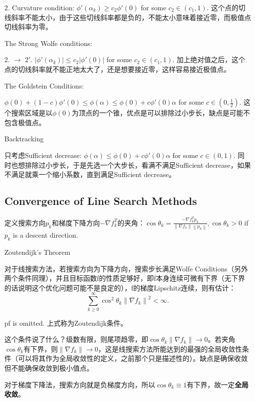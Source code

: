 2. Curvature condition: $\phi'(\alpha_k) \ge c_2 \phi'(0)$ for some $c_2 \in (c_1, 1)$. 这个点的切线斜率不能太小，由于这些切线斜率都是负的，不能太小意味着接近零，而极值点切线斜率为零。

The Strong Wolfe conditions:

2. $\to$ 2$'$. $|\phi'(\alpha_k)| \le c_2 |\phi'(0)|$ for some $c_2 \in (c_1, 1)$. 加上绝对值之后，这个点的切线斜率就不能正地太大了，还是想要接近零，这样容易接近极值点。

The Goldstein Conditions:

$\phi(0) + (1 - c) \phi'(0) \le \phi(\alpha) \le \phi(0) + c \phi'(0) \alpha$ for some $c \in (0, \frac{1}{2})$. 这个搜索区域是以$\phi(0)$为顶点的一个锥，优点是可以排除过小步长，缺点是可能不包含极值点。

Backtracking

只考虑Sufficient decrease: $\phi(\alpha) \le \phi(0) + c \phi'(0) \alpha$ for some $c \in (0, 1)$. 同时也想排除过小步长，于是先选一个大步长，看满不满足Sufficient decrease，如果不满足就乘一个缩小系数，直到满足Sufficient decrease。

\subsection{Convergence of Line Search Methods}

定义搜索方向$p_k$和梯度下降方向$- \nabla f_k^T $的夹角：$\cos \theta_{k}=\frac{-\nabla f_{k}^{T} p_{k}}{\left\|\nabla f_{k}\right\|\left\|p_{k}\right\|}, \cos \theta_{k} > 0$ if $p_k$ is a descent direction.

Zoutendijk's Theorem

对于线搜索方法，若搜索方向为下降方向，搜索步长满足Wolfe Conditions（另外两个条件同理），并且目标函数f的性质足够好，即f本身连续可微有下界（无下界的话说明这个优化问题可能不是良定的），f的梯度Lipschitz连续，则有估计：
\[
  \sum_{k \geq 0}^{\infty} \cos^{2} \theta_{k}\left\|\nabla f_{k}\right\|^{2}<\infty .
\]

pf is omitted. 上式称为Zoutendijk条件。

这个条件说了什么？级数有限，则尾项趋零，即$\cos \theta_{k}\left\|\nabla f_{k}\right\| \to 0$。若夹角$\cos \theta_k$有下界，则$\left\|\nabla f_{k}\right\| \to 0$，这是线搜索方法所能达到的最强的全局收敛性条件（可以将其作为全局收敛性的定义，之前那个只是描述性的）。缺点是确保收敛但不能确保收敛到极小值点。

对于梯度下降法，搜索方向就是负梯度方向，所以$\cos \theta_k \equiv 1$有下界，故一定\textbf{全局收敛}。


